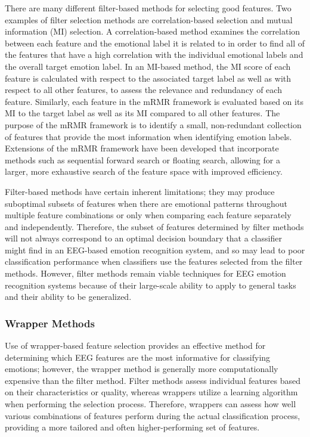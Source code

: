 \documentclass{WileyMSP-template}
\begin{document}
There are many different filter-based methods for selecting good features. Two examples of filter selection methods are correlation-based selection and mutual information (MI) selection. A correlation-based method examines the correlation between each feature and the emotional label it is related to in order to find all of the features that have a high correlation with the individual emotional labels and the overall target emotion label. In an MI-based method, the MI score of each feature is calculated with respect to the associated target label as well as with respect to all other features, to assess the relevance and redundancy of each feature. Similarly, each feature in the mRMR framework is evaluated based on its MI to the target label as well as its MI compared to all other features. The purpose of the mRMR framework is to identify a small, non-redundant collection of features that provide the most information when identifying emotion labels. Extensions of the mRMR framework have been developed that incorporate methods such as sequential forward search or floating search, allowing for a larger, more exhaustive search of the feature space with improved efficiency.

Filter-based methods have certain inherent limitations; they may produce suboptimal subsets of features when there are emotional patterns throughout multiple feature combinations or only when comparing each feature separately and independently. Therefore, the subset of features determined by filter methods will not always correspond to an optimal decision boundary that a classifier might find in an EEG-based emotion recognition system, and so may lead to poor classification performance when classifiers use the features selected from the filter methods. However, filter methods remain viable techniques for EEG emotion recognition systems because of their large-scale ability to apply to general tasks and their ability to be generalized.

\subsubsection{Wrapper Methods}
Use of wrapper-based feature selection provides an effective method for determining which EEG features are the most informative for classifying emotions; however, the wrapper method is generally more computationally expensive than the filter method. Filter methods assess individual features based on their characteristics or quality, whereas wrappers utilize a learning algorithm when performing the selection process. Therefore, wrappers can assess how well various combinations of features perform during the actual classification process, providing a more tailored and often higher-performing set of features.
\end{document}
